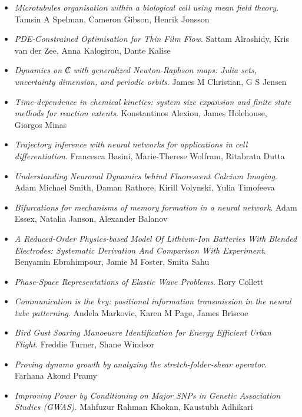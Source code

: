 \begin{itemize}
\item \textit{Microtubules organisation within a biological cell using mean field theory}.
Tamsin A Spelman, Cameron Gibson, Henrik Jonsson

\item \textit{PDE-Constrained Optimisation for Thin Film Flow}.
Sattam Alrashidy, Kris van der Zee, Anna Kalogirou, Dante Kalise

\item \textit{Dynamics on ₵ with generalized Newton-Raphson maps: Julia sets, uncertainty dimension, and periodic orbits}.
James M Christian, G S Jensen

\item \textit{Time-dependence in chemical kinetics: system size expansion and finite state methods for reaction extents}.
Konstantinos Alexiou, James Holehouse, Giorgos Minas

\item \textit{Trajectory inference with neural networks for applications in cell differentiation}.
Francesca Basini, Marie-Therese Wolfram, Ritabrata Dutta

\item \textit{Understanding Neuronal Dynamics behind Fluorescent Calcium Imaging}.
Adam Michael Smith, Daman Rathore, Kirill Volynski, Yulia Timofeeva

\item \textit{Bifurcations for mechanisms of memory formation in a neural network}.
Adam Essex, Natalia Janson, Alexander Balanov

\item \textit{A Reduced-Order Physics-based Model Of Lithium-Ion Batteries With Blended Electrodes: Systematic Derivation And Comparison With Experiment}.
Benyamin Ebrahimpour, Jamie M Foster, Smita Sahu

\item \textit{Phase-Space Representations of Elastic Wave Problems}.
Rory Collett

\item \textit{Communication is the key: positional information transmission in the neural tube patterning}.
Andela Markovic, Karen M Page, James Briscoe

\item \textit{Bird Gust Soaring Manoeuvre Identification for Energy Efficient Urban Flight}.
Freddie Turner, Shane Windsor

\item \textit{Proving dynamo growth by analyzing the stretch-folder-shear operator}.
Farhana Akond Pramy

\item \textit{Improving Power by Conditioning on Major SNPs in Genetic Association Studies (GWAS)}.
Mahfuzur Rahman Khokan, Kaustubh Adhikari

\end{itemize}

